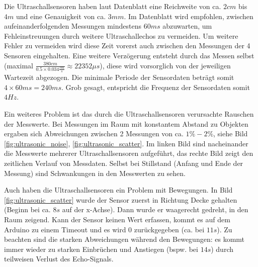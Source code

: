 Die Ultraschallsensoren haben laut Datenblatt \cite{elecfreaksUltrasonicRangingModule2023} eine Reichweite von ca. $2cm$ bis $4m$ und eine Genauigkeit von ca. $3mm$. Im Datenblatt wird empfohlen, zwischen aufeinanderfolgenden Messungen mindestens $60ms$ abzuwarten, um Fehleinstreuungen durch weitere Ultraschallechos zu vermeiden. Um weitere Fehler zu vermeiden wird diese Zeit vorerst auch zwischen den Messungen der 4 Sensoren eingehalten. Eine weitere Verzögerung entsteht durch das Messen selbst (maximal $\frac{380cm}{0.5 \times 0.034\frac{cm}{s}}\approx 22352\mu s$), diese wird vorsorglich von der jeweiligen Wartezeit abgezogen. Die minimale Periode der Sensordaten beträgt somit $4 \times 60ms=240ms$. Grob gesagt, entspricht die Frequenz der Sensordaten somit $4Hz$.

Ein weiteres Problem ist das durch die Ultraschallsensoren verursachte Rauschen der Messwerte. Bei Messungen im Raum mit konstantem Abstand zu Objekten ergaben sich Abweichungen zwischen 2 Messungen von ca. $1\%-2\%$, siehe Bild \ref{fig:ultrasonic_noise}, \ref{fig:ultrasonic_scatter}. Im linken Bild sind nacheinander die Messwerte mehrerer Ultraschallsensoren aufgeführt, das rechte Bild zeigt den zeitlichen Verlauf von Messdaten. Selbst bei Stillstand (Anfang und Ende der Messung) sind Schwankungen in den Messwerten zu sehen.

Auch haben die Ultraschallsensoren ein Problem mit Bewegungen. In Bild \ref{fig:ultrasonic_scatter} wurde der Sensor zuerst in Richtung Decke gehalten (Beginn bei ca. $8s$ auf der x-Achse). Dann wurde er waagerecht gedreht, in den Raum zeigend. Kann der Sensor keinen Wert erfassen, kommt es auf dem Arduino zu einem Timeout und es wird $0$ zurückgegeben (ca. bei $11s$). Zu beachten sind die starken Abweichungen während den Bewegungen: es kommt immer wieder zu starken Einbrüchen und Anstiegen (bspw. bei $14s$) durch teilweisen Verlust des Echo-Signals.

